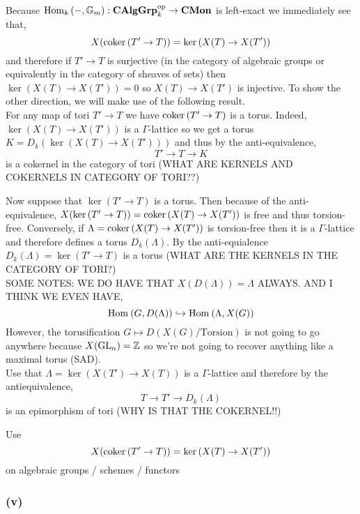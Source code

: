 \documentclass[12pt]{article}
\begin{document}
Because $\mathrm{Hom}_{k} \left( -, \mathbb{G}_m \right) : \mathbf{CAlgGrp}_k^{\mathrm{op}} \to \mathbf{CMon}$ is left-exact we immediately see that,
\[ X(\operatorname{\mathrm{coker}}{(T' \to T)}) = \ker{(X(T) \to X(T'))} \]
and therefore if $T' \to T$ is surjective (in the category of algebraic groups or equivalently in the category of sheaves of sets) then $\ker{(X(T) \to X(T'))} = 0$ so $X(T) \to X(T')$ is injective. To show the other direction, we will make use of the following result.
\bigskip\\
For any map of tori $T' \to T$ we have $\operatorname{\mathrm{coker}}{(T' \to T)}$ is a torus. Indeed, $\ker{(X(T) \to X(T'))}$ is a $\Gamma$-lattice so we get a torus $K = D_k(\ker{(X(T) \to X(T'))})$ and thus by the anti-equivalence,
\[ T' \to T \to K \]
is a cokernel in the category of tori (WHAT ARE KERNELS AND COKERNELS IN CATEGORY OF TORI??)



Now suppose that $\ker{(T' \to T)}$ is a torus. Then because of the anti-equivalence, $X(\ker{(T' \to T)}) = \operatorname{\mathrm{coker}}{(X(T) \to X(T'))}$ is free and thus torsion-free. Conversely, if $\Lambda = \operatorname{\mathrm{coker}}{(X(T) \to X(T'))}$ is torsion-free then it is a $\Gamma$-lattice and therefore defines a torus $D_k(\Lambda)$. By the anti-equialence $D_k(\Lambda) = \ker{(T' \to T)}$ is a torus (WHAT ARE THE KERNELS IN THE CATEGORY OF TORI?)
\bigskip\\




SOME NOTES: WE DO HAVE THAT $X(D(\Lambda)) = \Lambda$ ALWAYS. AND I THINK WE EVEN HAVE,
\[ \mathrm{Hom}_{} \left( G, D(\Lambda) \right) \hookrightarrow \mathrm{Hom}_{} \left( \Lambda, X(G) \right) \]
However, the torusification $G \mapsto D(X(G)/\text{Torsion})$ is not going to go anywhere because $X(\mathrm{GL}_n) = \mathbb{Z}$ so we're not going to recover anything like a maximal torus (SAD).
\bigskip\\


Use that $\Lambda = \ker{(X(T') \to X(T))}$ is a $\Gamma$-lattice and therefore by the antiequivalence,
\[ T \to T' \to D_k(\Lambda) \]
is an epimorphism of tori (WHY IS THAT THE COKERNEL!!)

Use 
\[ X(\operatorname{\mathrm{coker}}{(T' \to T)}) = \ker{(X(T) \to X(T'))} \]
on algebraic groups / schemes / functors

\subsubsection{(v)}
\end{document}
